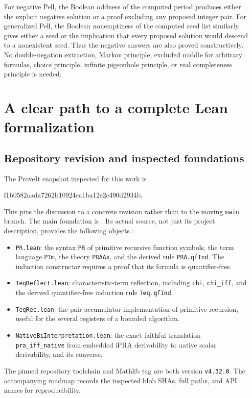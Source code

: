 \documentclass[11pt,letterpaper]{article}
\theoremstyle{definition}
\newcommand{\code}[1]{\texttt{#1}}
\begin{document}
For negative Pell, the Boolean oddness of the computed period produces
either the explicit negative solution or a proof excluding any proposed
integer pair. For generalized Pell, the Boolean nonemptiness of the computed
seed list similarly gives either a seed or the implication that every
proposed solution would descend to a nonexistent seed. Thus the negative
answers are also proved constructively. No double-negation extraction,
Markov principle, excluded middle for arbitrary formulas, choice principle,
infinite pigeonhole principle, or real completeness principle is needed.

\section{A clear path to a complete Lean formalization}\label{sec:lean}

\subsection{Repository revision and inspected foundations}

The ProveIt snapshot inspected for this work is
\begin{center}
\small\ttfamily f1b0582aada7262b10924ea1ba12e2e490d2934b.
\end{center}
This pins the discussion to a concrete revision rather than to the moving
\code{main} branch. The main foundation is
.
Its actual source, not just its project description, provides the following
objects \cite{proveit-pr,proveit-native}:
\begin{itemize}
\item \code{PR.lean}: the syntax \code{PR} of primitive recursive function
symbols, the term language \code{PTm}, the theory \code{PRAAx}, and the
derived rule \code{PRA.qfInd}. The induction constructor requires a proof
that its formula is quantifier-free.
\item \code{TeqReflect.lean}: characteristic-term reflection, including
\code{chi}, \code{chi\_iff}, and the derived quantifier-free induction rule
\code{Teq.qfInd}.
\item \code{TeqRec.lean}: the pair-accumulator implementation of primitive
recursion, useful for the several registers of a bounded algorithm.
\item \code{NativeBiInterpretation.lean}: the exact faithful translation
\code{pra\_iff\_native} from embedded iPRA derivability to native scalar
derivability, and its converse.
\end{itemize}
The pinned repository toolchain and Mathlib tag are both version
\code{v4.32.0}. The accompanying roadmap records the inspected blob SHAs,
full paths, and API names for reproducibility.
\end{document}
